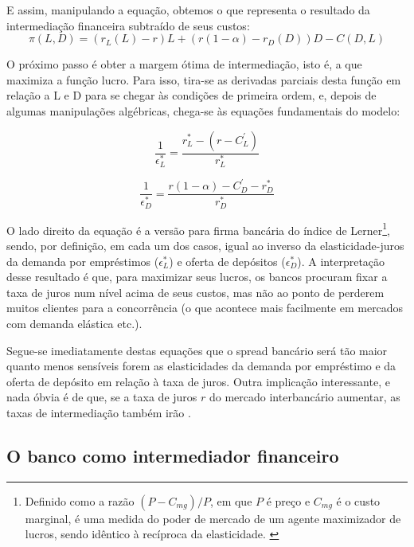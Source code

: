 \documentclass[a4paper, 12pt, openany, oneside, brazil]{abntex2}
\begin{document}
    E assim, manipulando a equação, obtemos o que representa o resultado da
    intermediação financeira subtraído de seus custos: \begin{equation}\pi(L, D)
    = (r_L(L) - r)L + (r(1 - \alpha) - r_D(D))D - C(D, L)\end{equation}

    O próximo passo é obter a margem ótima de intermediação, isto é, a que
    maximiza a função lucro. Para isso, tira-se as derivadas parciais desta
    função em relação a L e D para se chegar às condições de primeira ordem, e,
    depois de algumas manipulações algébricas, chega-se às equações fundamentais
    do modelo:

	\begin{equation}
	\frac{1}{\epsilon^{*}_L} = \frac{r^{*}_L - (r - C^{'}_L)}{r^{*}_L}
	\end{equation}

	\begin{equation}
	\frac{1}{\epsilon^{*}_D} = \frac{r(1-\alpha)-C^{'}_D - r^{*}_D}{r^{*}_D}
	\end{equation}

    O lado direito da equação é a versão para firma bancária do índice de
    Lerner\footnote{ Definido como a razão $(P - C_{mg}) / P$, em que $P$ é
    preço e $C_{mg}$ é o custo marginal, é uma medida do poder de mercado de um
agente maximizador de lucros, sendo idêntico à recíproca da elasticidade.
\cite{maudos}}, sendo, por definição, em cada um dos casos, igual ao inverso da
elasticidade-juros da demanda por empréstimos ($\epsilon^{*}_L$) e oferta de
depósitos ($\epsilon^{*}_D$). A interpretação desse resultado é que, para
maximizar seus lucros, os bancos procuram fixar a taxa de juros num nível acima
de seus custos, mas não ao ponto de perderem muitos clientes para a concorrência
(o que acontece mais facilmente em mercados com demanda elástica etc.).

    Segue-se imediatamente destas equações que o spread bancário será tão maior
    quanto menos sensíveis forem as elasticidades da demanda por empréstimo e da
    oferta de depósito em relação à taxa de juros. Outra implicação
    interessante, e nada óbvia é de que, se a taxa de juros $r$ do mercado
    interbancário aumentar, as taxas de intermediação também irão
    \cite[p.~59]{freixas}.

\subsection{O banco como intermediador financeiro}
\end{document}
